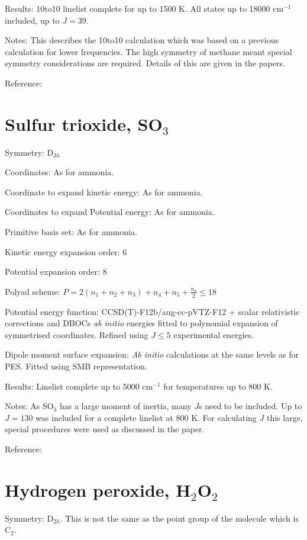 Results: 10to10 linelist complete for up to 1500 K. All states up to 18000 cm$^{-1}$ included, up to $J = 39$.

Notes: This describes the 10to10 calculation which was based on a previous calculation for lower frequencies. The high
symmetry of methane meant special symmetry considerations are required. Details of this are given in the papers. 

Reference: \cite{jt555,jt564}

\section{Sulfur trioxide, SO$_3$}

Symmetry: D$_{3h}$

Coordinates: As for ammonia.

Coordinate to expand kinetic energy: As for ammonia.

Coordinates to expand Potential energy: As for ammonia.

Primitive basis set: As for ammonia.

Kinetic energy expansion order: 6

Potential expansion order: 8

Polyad scheme: $P = 2(n_1 + n_2 + n_3) + n_4 + n_5 + \frac{n_6}{2} \leq 18 $

Potential energy function: CCSD(T)-F12b/aug-cc-pVTZ-F12 + scalar relativistic corrections and DBOCs \textit{ab initio}
energies fitted to polynomial expansion of symmetrised coordinates. Refined using $J \leq 5$ experimental energies.

Dipole moment surface expansion: \textit{Ab initio} calculations at the same levels as for PES. Fitted using SMB 
representation.

Results: Linelist complete up to 5000 cm$^{-1}$ for temperatures up to 800 K.

Notes: As SO$_3$ has a large moment of inertia, many $J$s need to be included. Up to $J = 130$ was included for 
a complete linelist at 800 K. For calculating $J$ this large, special procedures were used as discussed in the paper.

Reference: \cite{jt554,jt641}


\section{Hydrogen peroxide, H$_2$O$_2$}

Symmetry: D$_{2h}$. This is not the same as the point group of the molecule which is C$_2$.

